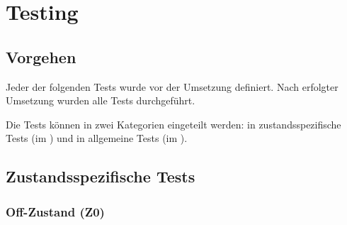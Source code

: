 \chapter{Testing}
\label{chap:testing}


\section{Vorgehen}
Jeder der folgenden Tests wurde vor der Umsetzung definiert.
Nach erfolgter Umsetzung wurden alle Tests durchgeführt.

Die Tests können in zwei Kategorien eingeteilt werden: in zustandsspezifische Tests (im ) und in allgemeine Tests (im ).

\newpage
\section{Zustandsspezifische Tests}
\label{sec:stateSpecificTest}
\subsection{Off-Zustand (Z0)}
